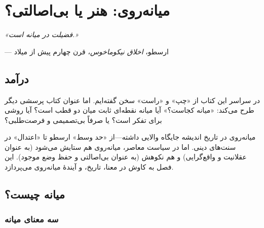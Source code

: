 \chapter{میانه‌روی: هنر یا بی‌اصالتی؟}

\begin{tcolorbox}[
    enhanced,
    colback=VeryLightGray, %
    colframe=CenterGreen, %
    boxrule=2pt,
    arc=8pt,
    fonttitle=\bfseries\large,
    title={\rl{نقل‌قول آغازین}},
    attach boxed title to top center={yshift=-3mm},
    boxed title style={colback=CenterGreen, colframe=CenterGreen} %
]
\begin{center}
\Large\textit{«فضیلت در میانه است.»}

\vspace{3mm}
\normalsize
--- ارسطو، \textit{اخلاق نیکوماخوس}، قرن چهارم پیش از میلاد
\end{center}
\end{tcolorbox}

\vspace{5mm}

\section*{درآمد}


در سراسر این کتاب از «چپ» و «راست» سخن گفته‌ایم. اما عنوان کتاب پرسشی دیگر طرح می‌کند: «میانه کجاست؟» آیا میانه نقطه‌ای ثابت میان دو قطب است؟ آیا روشی برای تفکر است؟ یا صرفاً بی‌تصمیمی و فرصت‌طلبی؟

میانه‌روی در تاریخ اندیشه جایگاه والایی داشته—از «حد وسط» ارسطو تا «اعتدال» در سنت‌های دینی. اما در سیاست معاصر، میانه‌روی هم ستایش می‌شود (به عنوان عقلانیت و واقع‌گرایی) و هم نکوهش (به عنوان بی‌اصالتی و حفظ وضع موجود). این فصل به کاوش در معنا، تاریخ، و آیندهٔ میانه‌روی می‌پردازد.


\section{میانه چیست؟}

\subsection{سه معنای میانه}


